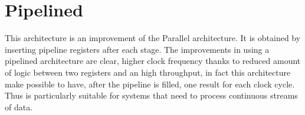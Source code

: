\section{Pipelined}\label{sec:pipelined}
This architecture is an improvement of the Parallel architecture. It is obtained
by inserting pipeline registers after each stage.
The improvements in using a pipelined architecture are clear, higher clock
frequency thanks to reduced amount of logic between two registers and an high
throughput, in fact this architecture make possible to have, after the pipeline
is filled, one result for each clock cycle. Thus is particularly suitable
for systems that need to process continuous streams of data.
